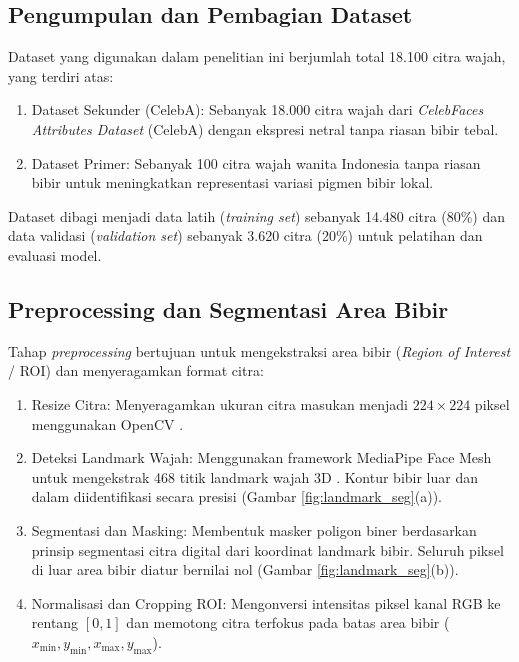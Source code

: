 \documentclass[10pt,a4paper]{article}
\begin{document}
\subsection{Pengumpulan dan Pembagian Dataset}
Dataset yang digunakan dalam penelitian ini berjumlah total 18.100 citra wajah, yang terdiri atas:
\begin{enumerate}
    \item Dataset Sekunder (CelebA): Sebanyak 18.000 citra wajah dari \textit{CelebFaces Attributes Dataset} (CelebA) \cite{liu2015deep} dengan ekspresi netral tanpa riasan bibir tebal.
    \item Dataset Primer: Sebanyak 100 citra wajah wanita Indonesia tanpa riasan bibir untuk meningkatkan representasi variasi pigmen bibir lokal.
\end{enumerate}
Dataset dibagi menjadi data latih (\textit{training set}) sebanyak 14.480 citra (80\%) dan data validasi (\textit{validation set}) sebanyak 3.620 citra (20\%) untuk pelatihan dan evaluasi model.

\subsection{Preprocessing dan Segmentasi Area Bibir}
Tahap \textit{preprocessing} bertujuan untuk mengekstraksi area bibir (\textit{Region of Interest} / ROI) dan menyeragamkan format citra:
\begin{enumerate}
    \item Resize Citra: Menyeragamkan ukuran citra masukan menjadi $224 \times 224$ piksel menggunakan OpenCV \cite{bradski2000opencv}.
    \item Deteksi Landmark Wajah: Menggunakan framework MediaPipe Face Mesh untuk mengekstrak 468 titik landmark wajah 3D \cite{lugaresi2019mediapipe}. Kontur bibir luar dan dalam diidentifikasi secara presisi (Gambar \ref{fig:landmark_seg}(a)).
    \item Segmentasi dan Masking: Membentuk masker poligon biner berdasarkan prinsip segmentasi citra digital \cite{otsu1979threshold, gonzalez2018digital} dari koordinat landmark bibir. Seluruh piksel di luar area bibir diatur bernilai nol (Gambar \ref{fig:landmark_seg}(b)).
    \item Normalisasi dan Cropping ROI: Mengonversi intensitas piksel kanal RGB ke rentang $[0, 1]$ dan memotong citra terfokus pada batas area bibir ($x_{\min}, y_{\min}, x_{\max}, y_{\max}$).
\end{enumerate}
\end{document}
